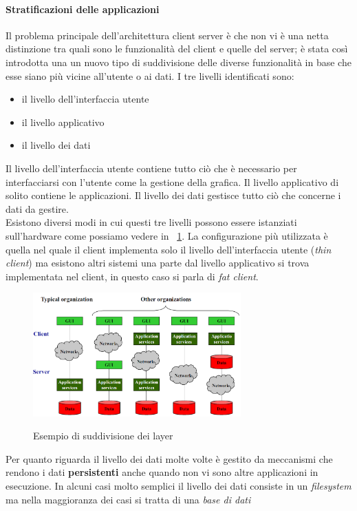 \paragraph{Stratificazioni delle applicazioni}
Il problema principale dell'architettura client server è che non vi è una netta distinzione tra quali sono le funzionalità del client e quelle del server; è stata così introdotta una un nuovo tipo di suddivisione delle diverse funzionalità in base che esse siano più vicine all'utente o ai dati. I tre livelli identificati sono:
\begin{itemize}
\item il livello dell'interfaccia utente
\item il livello applicativo
\item il livello dei dati
\end{itemize}
Il livello dell'interfaccia utente contiene tutto ciò che è necessario per interfacciarsi con l'utente come la gestione della grafica. Il livello applicativo di solito contiene le applicazioni. Il livello dei dati gestisce tutto ciò che concerne i dati da gestire.\\
Esistono diversi modi in cui questi tre livelli possono essere istanziati sull'hardware come possiamo vedere in \figurename~\ref{fig:layer}.
La configurazione più utilizzata è quella nel quale il client implementa solo il livello dell'interfaccia utente (\emph{thin client}) ma esistono altri sistemi una parte dal livello applicativo si trova implementata nel client, in questo caso si parla di \emph{fat client}.
\begin{figure}[htb]
\centering
\includegraphics[width=8cm]{img/layer.png}\\
\caption{Esempio di suddivisione dei layer}\label{fig:layer}
\end{figure}
Per quanto riguarda il livello dei dati molte volte è gestito da meccanismi che rendono i dati \textbf{persistenti} anche quando non vi sono altre applicazioni in esecuzione. In alcuni casi molto semplici il livello dei dati consiste in un  \emph{filesystem} ma nella maggioranza dei casi si tratta di una \emph{base di dati}
